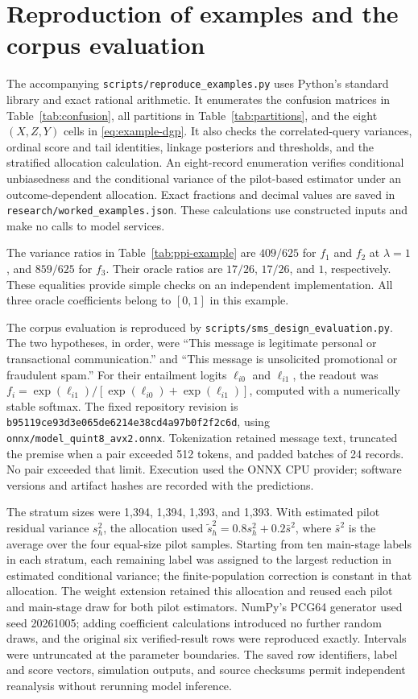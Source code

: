 \documentclass[11pt,a4paper]{article}
\begin{document}
\section{Reproduction of examples and the corpus evaluation}\label{app:reproduction}

The accompanying \nolinkurl{scripts/reproduce_examples.py} uses Python's standard library and exact rational arithmetic. It enumerates the confusion matrices in Table~\ref{tab:confusion}, all partitions in Table~\ref{tab:partitions}, and the eight $(X,Z,Y)$ cells in \eqref{eq:example-dgp}. It also checks the correlated-query variances, ordinal score and tail identities, linkage posteriors and thresholds, and the stratified allocation calculation. An eight-record enumeration verifies conditional unbiasedness and the conditional variance of the pilot-based estimator under an outcome-dependent allocation. Exact fractions and decimal values are saved in \texttt{research/worked\_examples.json}. These calculations use constructed inputs and make no calls to model services.

The variance ratios in Table~\ref{tab:ppi-example} are $409/625$ for $f_1$ and $f_2$ at $\lambda=1$, and $859/625$ for $f_3$. Their oracle ratios are $17/26$, $17/26$, and $1$, respectively. These equalities provide simple checks on an independent implementation. All three oracle coefficients belong to $[0,1]$ in this example.

The corpus evaluation is reproduced by \nolinkurl{scripts/sms_design_evaluation.py}. The two hypotheses, in order, were ``This message is legitimate personal or transactional communication.'' and ``This message is unsolicited promotional or fraudulent spam.'' For their entailment logits $\ell_{i0}$ and $\ell_{i1}$, the readout was $f_i=\exp(\ell_{i1})/[\exp(\ell_{i0})+\exp(\ell_{i1})]$, computed with a numerically stable softmax. The fixed repository revision is \nolinkurl{b95119ce93d3e065de6214e38cd4a97b0f2f2c6d}, using \nolinkurl{onnx/model_quint8_avx2.onnx}. Tokenization retained message text, truncated the premise when a pair exceeded 512 tokens, and padded batches of 24 records. No pair exceeded that limit. Execution used the ONNX CPU provider; software versions and artifact hashes are recorded with the predictions.

The stratum sizes were 1,394, 1,394, 1,393, and 1,393. With estimated pilot residual variance $s_h^2$, the allocation used $\widetilde s_h^2=0.8s_h^2+0.2\bar s^2$, where $\bar s^2$ is the average over the four equal-size pilot samples. Starting from ten main-stage labels in each stratum, each remaining label was assigned to the largest reduction in estimated conditional variance; the finite-population correction is constant in that allocation. The weight extension retained this allocation and reused each pilot and main-stage draw for both pilot estimators. NumPy's PCG64 generator used seed 20261005; adding coefficient calculations introduced no further random draws, and the original six verified-result rows were reproduced exactly. Intervals were untruncated at the parameter boundaries. The saved row identifiers, label and score vectors, simulation outputs, and source checksums permit independent reanalysis without rerunning model inference.
\end{document}
